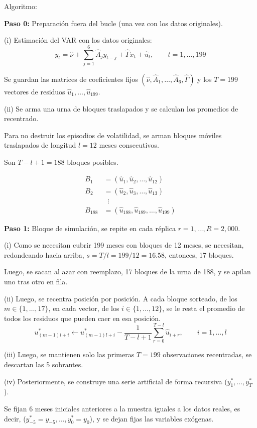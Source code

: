 \documentclass[12pt,letterpaper]{article}
\begin{document}
Algoritmo:

\textbf{Paso 0:} Preparación fuera del bucle (una vez con los datos originales).

(i) Estimación del VAR con los datos originales:
$$y_t = \hat{\nu} + \sum_{j=1}^6 \hat{A}_j y_{t-j} + \hat{\Gamma} x_t + \hat{u}_t, \qquad t = 1, \dots, 199$$

Se guardan las matrices de coeficientes fijos $(\hat{\nu}, \hat{A}_1, \dots, \hat{A}_6, \hat{\Gamma})$ y los $T = 199$ vectores de residuos $\hat{u}_1, \dots, \hat{u}_{199}$.

(ii) Se arma una urna de bloques traslapados y se calculan los promedios de recentrado.

Para no destruir los episodios de volatilidad, se arman bloques móviles traslapados de longitud $l=12$ meses consecutivos.

Son $T-l+1 = 188$ bloques posibles.

$$\begin{aligned} B_1 &= (\hat{u}_1, \hat{u}_2, \dots, \hat{u}_{12}) \\ B_2 &= (\hat{u}_2, \hat{u}_3, \dots, \hat{u}_{13}) \\ &\;\;\vdots \\ B_{188} &= (\hat{u}_{188}, \hat{u}_{189}, \dots, \hat{u}_{199}) \end{aligned}$$

\textbf{Paso 1:} Bloque de simulación, se repite en cada réplica $r=1, \dots, R=2{,}000$.

(i) Como se necesitan cubrir 199 meses con bloques de 12 meses, se necesitan, redondeando hacia arriba, $s = T/l = 199/12 = 16.58$, entonces, 17 bloques.

Luego, se sacan al azar con reemplazo, 17 bloques de la urna de 188, y se apilan uno tras otro en fila.

(ii) Luego, se recentra posición por posición. A cada bloque sorteado, de los $m \in \{1, \dots, 17\}$, en cada vector, de los $i \in \{1, \dots, 12\}$, se le resta el promedio de todos los residuos que pueden caer en esa posición.
$$u_{(m-1)l+i}^* \leftarrow u_{(m-1)l+i}^* - \frac{1}{T - l + 1} \sum_{r=0}^{T-l} \hat{u}_{i+r}, \qquad i = 1, \dots, l$$

(iii) Luego, se mantienen solo las primeras $T=199$ observaciones recentradas, se descartan las 5 sobrantes.

(iv) Posteriormente, se construye una serie artificial de forma recursiva ($y_1^*, \dots, y_T^*$).

Se fijan 6 meses iniciales anteriores a la muestra iguales a los datos reales, es decir, ($y_{-5}^* = y_{-5}, \dots, y_0^* = y_0$), y se dejan fijas las variables exógenas.
\end{document}
